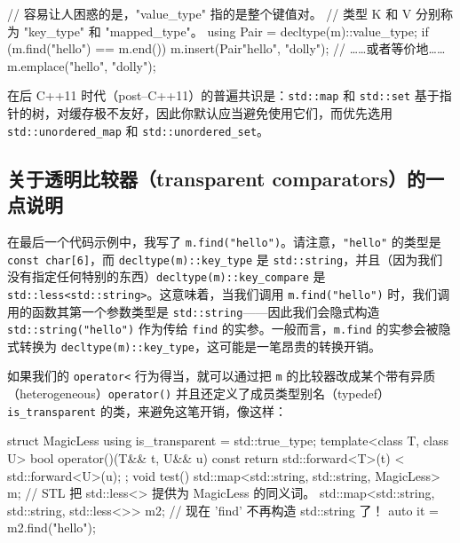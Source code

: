 \begin{codebox}[cpp]
    // 容易让人困惑的是，"value_type" 指的是整个键值对。
    // 类型 K 和 V 分别称为 "key_type" 和 "mapped_type"。
    using Pair = decltype(m)::value_type;
    if (m.find("hello") == m.end()) {
      m.insert(Pair{"hello", "dolly"});
      // ……或者等价地……
      m.emplace("hello", "dolly");
    }
\end{codebox}

在后 C++11 时代（post–C++11）的普遍共识是：\texttt{std::\allowbreak{}map} 和 \texttt{std::\allowbreak{}set} 基于指针的树，对缓存极不友好，因此你默认应当避免使用它们，而优先选用 \texttt{std::\allowbreak{}unordered\_\allowbreak{}map} 和 \texttt{std::\allowbreak{}unordered\_\allowbreak{}set}。

\subsection{关于透明比较器（transparent comparators）的一点说明}

在最后一个代码示例中，我写了 \texttt{m.\allowbreak{}find(\allowbreak{}"hello")\allowbreak{}}。请注意，\texttt{"hello"} 的类型是 \texttt{const char[6]}，而 \texttt{decltype(\allowbreak{}m)\allowbreak{}::\allowbreak{}key\_\allowbreak{}type} 是 \texttt{std::\allowbreak{}string}，并且（因为我们没有指定任何特别的东西）\texttt{decltype(\allowbreak{}m)\allowbreak{}::\allowbreak{}key\_\allowbreak{}compare} 是 \texttt{std::\allowbreak{}less<\allowbreak{}std::\allowbreak{}string>\allowbreak{}}。这意味着，当我们调用 \texttt{m.\allowbreak{}find(\allowbreak{}"hello")\allowbreak{}} 时，我们调用的函数其第一个参数类型是 \texttt{std::\allowbreak{}string}——因此我们会隐式构造 \texttt{std::\allowbreak{}string(\allowbreak{}"hello")\allowbreak{}} 作为传给 \texttt{find} 的实参。一般而言，\texttt{m.\allowbreak{}find} 的实参会被隐式转换为 \texttt{decltype(\allowbreak{}m)\allowbreak{}::\allowbreak{}key\_\allowbreak{}type}，这可能是一笔昂贵的转换开销。

如果我们的 \texttt{operator<} 行为得当，就可以通过把 \texttt{m} 的比较器改成某个带有异质（heterogeneous）\texttt{operator(\allowbreak{})\allowbreak{}} 并且还定义了成员类型别名（typedef）\texttt{is\_\allowbreak{}transparent} 的类，来避免这笔开销，像这样：

\begin{codebox}[cpp]
    struct MagicLess {
      using is_transparent = std::true_type;
      template<class T, class U>
      bool operator()(T&& t, U&& u) const {
        return std::forward<T>(t) < std::forward<U>(u);
      }
    };
    void test()
    {
      std::map<std::string, std::string, MagicLess> m;
      // STL 把 std::less<> 提供为 MagicLess 的同义词。
      std::map<std::string, std::string, std::less<>> m2;
      // 现在 'find' 不再构造 std::string 了！
      auto it = m2.find("hello");
    }
\end{codebox}

